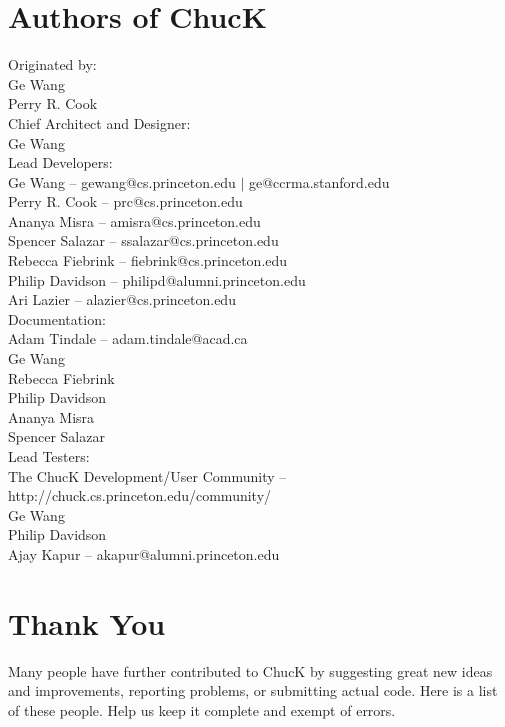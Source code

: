 \newpage
\section{Authors of ChucK}

Originated by:\\
\authtab Ge Wang\\
\authtab Perry R. Cook\\

Chief Architect and Designer:\\
\authtab Ge Wang\\

Lead Developers:\\
\authtab Ge Wang -- gewang@cs.princeton.edu $|$ ge@ccrma.stanford.edu\\
\authtab Perry R. Cook -- prc@cs.princeton.edu\\
\authtab Ananya Misra -- amisra@cs.princeton.edu\\
\authtab Spencer Salazar -- ssalazar@cs.princeton.edu\\
\authtab Rebecca Fiebrink -- fiebrink@cs.princeton.edu\\
\authtab Philip Davidson -- philipd@alumni.princeton.edu\\
\authtab Ari Lazier -- alazier@cs.princeton.edu\\

Documentation:\\
\authtab Adam Tindale -- adam.tindale@acad.ca\\
\authtab Ge Wang\\
\authtab Rebecca Fiebrink\\
\authtab Philip Davidson\\
\authtab Ananya Misra\\
\authtab Spencer Salazar\\

Lead Testers:\\
\authtab The ChucK Development/User Community -- http://chuck.cs.princeton.edu/community/\\
\authtab Ge Wang\\
\authtab Philip Davidson\\
\authtab Ajay Kapur -- akapur@alumni.princeton.edu\\

\newpage
\section{Thank You}

Many people have further contributed to ChucK by suggesting great new ideas and improvements, reporting problems, or submitting actual code. Here is a list of these people.  Help us keep it complete and exempt of errors.

